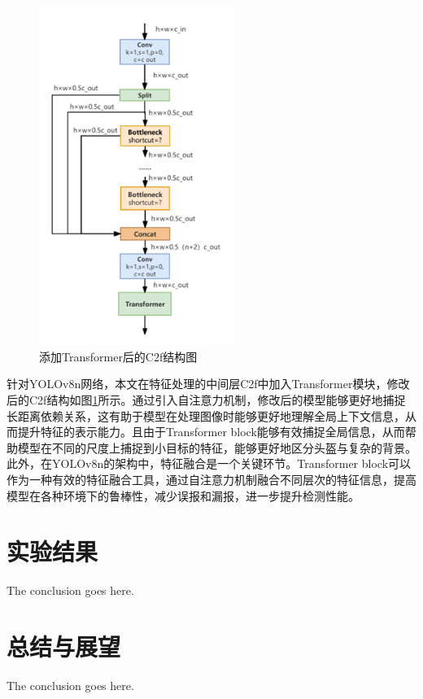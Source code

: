 \documentclass[journal]{IEEEtran}
\numberwithin{figure}{section}%
\begin{document}
\begin{figure}
  \centering
  \includegraphics[width=2.5in]{./figures/4_4.png}
  \caption{添加Transformer后的C2f结构图}
  \label{fig:C2fr}
\end{figure}

针对YOLOv8n网络，本文在特征处理的中间层C2f中加入Transformer模块，修改后的C2f结构如图\ref{fig:C2fr}所示。通过引入自注意力机制，修改后的模型能够更好地捕捉长距离依赖关系，这有助于模型在处理图像时能够更好地理解全局上下文信息，从而提升特征的表示能力。且由于Transformer block能够有效捕捉全局信息，从而帮助模型在不同的尺度上捕捉到小目标的特征，能够更好地区分头盔与复杂的背景。此外，在YOLOv8n的架构中，特征融合是一个关键环节。Transformer block可以作为一种有效的特征融合工具，通过自注意力机制融合不同层次的特征信息，提高模型在各种环境下的鲁棒性，减少误报和漏报，进一步提升检测性能。


\section{实验结果}
The conclusion goes here.

\section{总结与展望}
The conclusion goes here.

\end{document}
